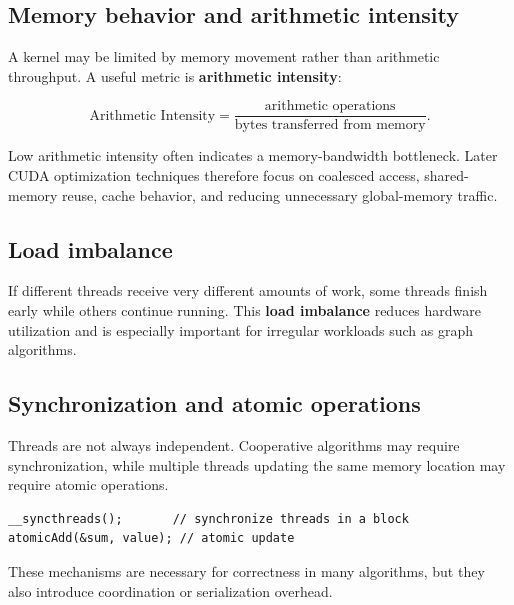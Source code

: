\documentclass[11pt,a4paper]{article}
\begin{document}
\subsection{Memory behavior and arithmetic intensity}

A kernel may be limited by memory movement rather than arithmetic throughput. A useful metric is \textbf{arithmetic intensity}:

\begin{equation}
\text{Arithmetic Intensity}
=
\frac{\text{arithmetic operations}}
{\text{bytes transferred from memory}}.
\end{equation}

Low arithmetic intensity often indicates a memory-bandwidth bottleneck. Later CUDA optimization techniques therefore focus on coalesced access, shared-memory reuse, cache behavior, and reducing unnecessary global-memory traffic.

\subsection{Load imbalance}

If different threads receive very different amounts of work, some threads finish early while others continue running. This \textbf{load imbalance} reduces hardware utilization and is especially important for irregular workloads such as graph algorithms.

\subsection{Synchronization and atomic operations}

Threads are not always independent. Cooperative algorithms may require synchronization, while multiple threads updating the same memory location may require atomic operations.

\begin{lstlisting}
__syncthreads();       // synchronize threads in a block
atomicAdd(&sum, value); // atomic update
\end{lstlisting}

These mechanisms are necessary for correctness in many algorithms, but they also introduce coordination or serialization overhead.
\end{document}
